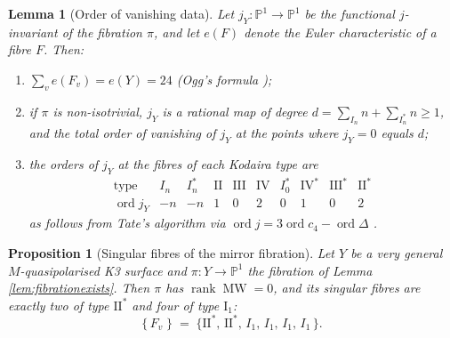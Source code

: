 \documentclass[11pt]{amsart}
\theoremstyle{plain}
\newtheorem{proposition}[theorem]{Proposition}
\newtheorem{lemma}[theorem]{Lemma}
\theoremstyle{definition}
\newcommand{\Pn}{\mathbb{P}^1}
\begin{document}
\begin{lemma}[Order of vanishing data]\label{lem:jorders}
Let $j_Y\colon\Pn\to\Pn$ be the functional $j$-invariant of the fibration
$\pi$, and let $e(F)$ denote the Euler characteristic of a fibre $F$.
Then:
\begin{enumerate}
\item[(a)] $\sum_v e(F_v)=e(Y)=24$ (Ogg's formula
\cite{Mir89,Kod63});
\item[(b)] if $\pi$ is non-isotrivial, $j_Y$ is a rational map of degree
$d=\sum_{I_n}n+\sum_{I_n^*}n\geq 1$, and the total order of vanishing of $j_Y$
at the points where $j_Y=0$ equals $d$;
\item[(c)] the orders of $j_Y$ at the fibres of each Kodaira type are
\[
\begin{array}{c|cccccccccc}
\text{type} & I_n & I_n^* & \mathrm{II} & \mathrm{III} & \mathrm{IV} &
I_0^* & \mathrm{IV}^* & \mathrm{III}^* & \mathrm{II}^*\\
\hline
\operatorname{ord} j_Y & -n & -n & 1 & 0 & 2 & 0 & 1 & 0 & 2
\end{array}
\]
as follows from Tate's algorithm via
$\operatorname{ord} j = 3\operatorname{ord} c_4-\operatorname{ord}\Delta$
\cite{Kod63,Mir89}.
\end{enumerate}
\end{lemma}

\begin{proposition}[Singular fibres of the mirror fibration]\label{prop:fibres}
Let $Y$ be a very general $M$-quasipolarised K3 surface and
$\pi\colon Y\to\Pn$ the fibration of Lemma \ref{lem:fibrationexists}. Then
$\pi$ has $\operatorname{rank}\operatorname{MW}=0$, and its singular fibres are
\emph{exactly} two of type $\mathrm{II}^*$ and four of type $\mathrm{I}_1$:
\[
\{\,F_v\;\}\;=\;\{\mathrm{II}^*,\,\mathrm{II}^*,\,I_1,\,I_1,\,I_1,\,I_1\,\}.
\]
\end{proposition}
\end{document}
